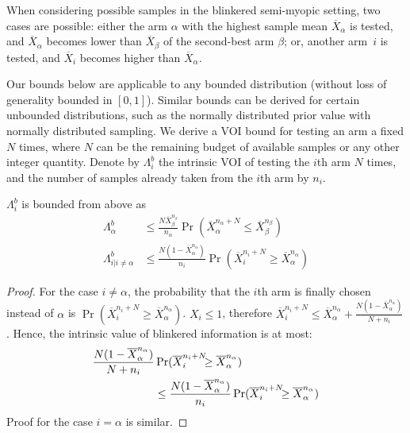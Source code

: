 When considering possible samples in the blinkered semi-myopic setting,
two cases are possible: either
	the arm $\alpha$ with the highest sample mean $\overline
  	X_\alpha$ is tested, and $\overline X_\alpha$ becomes lower than
 	$\overline X_\beta$ of the second-best arm $\beta$;
or, 
	another arm~$i$ is tested, and $\overline X_i$ becomes higher
    than $\overline X_\alpha$.


Our bounds below are applicable to any bounded distribution (without loss of generality 
bounded in $[0,1]$). Similar
bounds can be derived for certain unbounded distributions, such as the
normally distributed prior value with normally distributed
sampling.
We derive a VOI bound for testing an arm a fixed $N$ times,
where $N$ can be the remaining budget of available samples or
any other integer quantity.
Denote by  $\Lambda_i^b$ the intrinsic VOI of testing the $i$th arm
$N$ times, and the number of
samples already taken from the $i$th arm by $n_i$.
\begin{thm} $\Lambda_i^b$ is bounded from above as
\begin{align}
\label{eqn:thm-be}
  \Lambda_\alpha^b&\le \frac {N \overline X_\beta^{n_\beta}} {n_\alpha} \Pr(\overline X_\alpha^{n_\alpha+N}\le\overline X_\beta^{n_\beta})\nonumber\\
\Lambda_{i|i\ne\alpha}^b&\le \frac {N(1-\overline X_\alpha^{n_\alpha})} {n_i}\Pr(\overline   X_i^{{n_i}+N}\ge\overline X_\alpha^{n_\alpha})
\end{align}
\vspace{-24pt}
\label{thm:be}
\end{thm}
\begin{proof} For the case $i\ne \alpha$, the probability that the
	  $i$th arm is finally chosen instead of $\alpha$ is
	  $\Pr(\overline X_i^{n_i+N} \ge \overline X_\alpha^{n_\alpha})$. $X_i \le 1$,
	  therefore $\overline X_i^{n_i+N}\le \overline
	  X_\alpha^{n_\alpha}+\frac {N(1-\overline X_\alpha^{n_\alpha})} {N+n_i}$. Hence, the intrinsic value of blinkered
	  information is at most: 
	\begin{align}
	\label{eq:simplistic}
	\frac{ N(1-\overline  X_\alpha^{n_\alpha})}
	  {N+n_i}&\Pr(\overline X_i^{{n_i}+N}\hspace{-0.5em}\ge\overline X_\alpha^{n_\alpha})\nonumber \\
	&\le\frac{ N(1-\overline  X_\alpha^{n_\alpha})}
	{n_i}\Pr(\overline X_i^{{n_i}+N}\hspace{-0.5em}\ge\overline X_\alpha^{n_\alpha})
	\end{align}
	  Proof for the case $i=\alpha$ is similar.
\end{proof}


